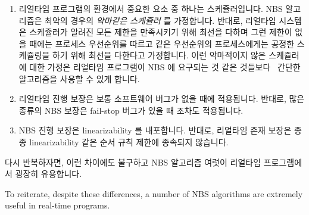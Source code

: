 \begin{enumerate}
\item	리얼타임 프로그램의 환경에서 중요한 요소 중 하나는 스케쥴러입니다.
	NBS 알고리즘은 최악의 경우의 \emph{악마같은 스케쥴러} 를 가정합니다.
	반대로, 리얼타임 시스템은 스케쥴러가 알려진 모든 제한을 만족시키기 위해
	최선을 다하며 그런 제한이 없을 때에는 프로세스 우선순위를 따르고 같은
	우선순위의 프로세스에게는 공정한 스케쥴링을 하기 위해 최선을 다한다고
	가정합니다.
	이런 악마적이지 않은 스케쥴러에 대한 가정은 리얼타임 프로그램이 NBS 에
	요구되는 것 같은
	것들보다~\cite{DanAlitarh2013PracticalProgress,BjoernBrandenburgPhD}
	간단한 알고리즘을 사용할 수 있게 합니다.
\item	리얼타임 진행 보장은 보통 소프트웨어 버그가 없을 때에 적용됩니다.
	반대로, 많은 종류의 NBS 보장은 fail-stop 버그가 있을 때 조차도
	적용됩니다.
\item	NBS 진행 보장은 linearizability 를 내포합니다.
	반대로, 리얼타임 존재 보장은 종종 linearizability 같은 순서 규칙 제한에
	종속되지 않습니다.

\iffalse

\item	An important component of a real-time program's environment
	is the scheduler.
	NBS algorithms assume a worst-case \emph{demonic scheduler}.
	In contrast, real-time systems assume that the scheduler is
	doing its level best to satisfy any scheduling constraints
	it knows about, and, in the absence of such constraints,
	its level best to honor process priorities and to provide
	fair scheduling to processes of the same priority.
	This assumption of a non-demonic scheduler allows real-time
	programs to use simpler algorithms than those required for
	NBS~\cite{DanAlitarh2013PracticalProgress,BjoernBrandenburgPhD}.
\item	Real-time forward-progress guarantees usually apply only
	in the absence of software bugs.
	In contrast, many classes of NBS guarantees apply even in the
	face of fail-stop bugs.
\item	NBS forward-progress guarantee classes imply linearizability.
	In contrast, real-time forward progress guarantees are often
	independent of ordering constraints such as linearizability.

\fi

\end{enumerate}

다시 반복하자면, 이런 차이에도 불구하고 NBS 알고리즘 여럿이 리얼타임
프로그램에서 굉장히 유용합니다.

\iffalse

To reiterate, despite these differences, a number of NBS algorithms are
extremely useful in real-time programs.

